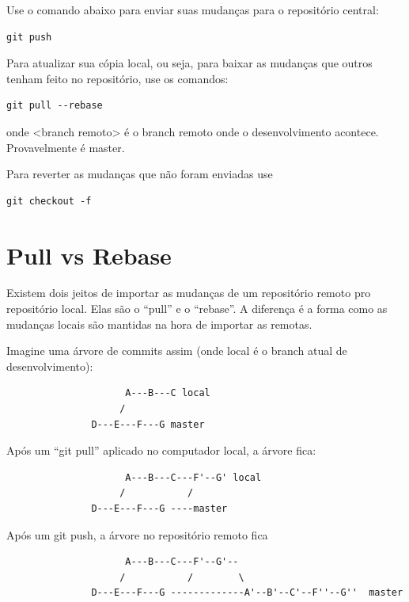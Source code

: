 \documentclass[12pt,brazil]{book}
\begin{document}
Use o comando abaixo para enviar suas mudanças para o repositório
central:

\begin{verbatim}
git push
\end{verbatim}

Para atualizar sua cópia local, ou seja, para baixar as mudanças que
outros tenham feito no repositório, use os comandos:

\begin{verbatim}
git pull --rebase
\end{verbatim}

onde <branch remoto> é o branch remoto onde o desenvolvimento
acontece. Provavelmente é master.

Para reverter as mudanças que não foram enviadas use

\begin{verbatim}
git checkout -f
\end{verbatim}


\section{Pull vs Rebase}

Existem dois jeitos de importar as mudanças de um repositório remoto
pro repositório local. Elas são o ``pull'' e o ``rebase''. A diferença
é a forma como as mudanças locais são mantidas na hora de importar as
remotas.

Imagine uma árvore de commits assim (onde local é o branch atual de desenvolvimento):

\begin{verbatim}
                     A---B---C local
                    /
               D---E---F---G master
\end{verbatim}

Após um ``git pull'' aplicado no computador local, a árvore fica:

\begin{verbatim}
                     A---B---C---F'--G' local
                    /           /
               D---E---F---G ----master
\end{verbatim}

Após um git push, a árvore no repositório remoto fica

\begin{verbatim}
                     A---B---C---F'--G'-- 
                    /           /        \
               D---E---F---G -------------A'--B'--C'--F''--G''  master
\end{verbatim}
\end{document}
